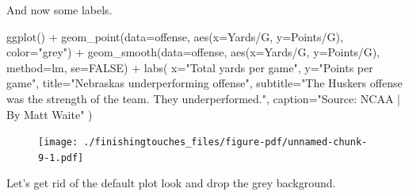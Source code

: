 \documentclass[
  letterpaper,
  DIV=11,
  numbers=noendperiod]{scrreprt}
\newenvironment{Shaded}{\begin{snugshade}}{\end{snugshade}}
\newcommand{\AttributeTok}[1]{\textcolor[rgb]{0.40,0.45,0.13}{#1}}
\newcommand{\ConstantTok}[1]{\textcolor[rgb]{0.56,0.35,0.01}{#1}}
\newcommand{\FunctionTok}[1]{\textcolor[rgb]{0.28,0.35,0.67}{#1}}
\newcommand{\NormalTok}[1]{\textcolor[rgb]{0.00,0.23,0.31}{#1}}
\newcommand{\SpecialCharTok}[1]{\textcolor[rgb]{0.37,0.37,0.37}{#1}}
\newcommand{\StringTok}[1]{\textcolor[rgb]{0.13,0.47,0.30}{#1}}
\begin{document}
And now some labels.

\begin{Shaded}
\begin{Highlighting}[]
\FunctionTok{ggplot}\NormalTok{() }\SpecialCharTok{+} 
  \FunctionTok{geom\_point}\NormalTok{(}\AttributeTok{data=}\NormalTok{offense, }\FunctionTok{aes}\NormalTok{(}\AttributeTok{x=}\StringTok{\textasciigrave{}}\AttributeTok{Yards/G}\StringTok{\textasciigrave{}}\NormalTok{, }\AttributeTok{y=}\StringTok{\textasciigrave{}}\AttributeTok{Points/G}\StringTok{\textasciigrave{}}\NormalTok{), }\AttributeTok{color=}\StringTok{"grey"}\NormalTok{) }\SpecialCharTok{+} 
  \FunctionTok{geom\_smooth}\NormalTok{(}\AttributeTok{data=}\NormalTok{offense, }\FunctionTok{aes}\NormalTok{(}\AttributeTok{x=}\StringTok{\textasciigrave{}}\AttributeTok{Yards/G}\StringTok{\textasciigrave{}}\NormalTok{, }\AttributeTok{y=}\StringTok{\textasciigrave{}}\AttributeTok{Points/G}\StringTok{\textasciigrave{}}\NormalTok{), }\AttributeTok{method=}\NormalTok{lm, }\AttributeTok{se=}\ConstantTok{FALSE}\NormalTok{) }\SpecialCharTok{+} 
  \FunctionTok{labs}\NormalTok{(}
    \AttributeTok{x=}\StringTok{"Total yards per game"}\NormalTok{, }
    \AttributeTok{y=}\StringTok{"Points per game"}\NormalTok{, }
    \AttributeTok{title=}\StringTok{"Nebraska\textquotesingle{}s underperforming offense"}\NormalTok{, }
    \AttributeTok{subtitle=}\StringTok{"The Husker\textquotesingle{}s offense was the strength of the team. They underperformed."}\NormalTok{,}
    \AttributeTok{caption=}\StringTok{"Source: NCAA | By Matt Waite"}
\NormalTok{    )}
\end{Highlighting}
\end{Shaded}

\begin{figure}[H]

{\centering \texttt{[image: ./finishingtouches\_files/figure-pdf/unnamed-chunk-9-1.pdf]}

}

\end{figure}

Let's get rid of the default plot look and drop the grey background.
\end{document}
